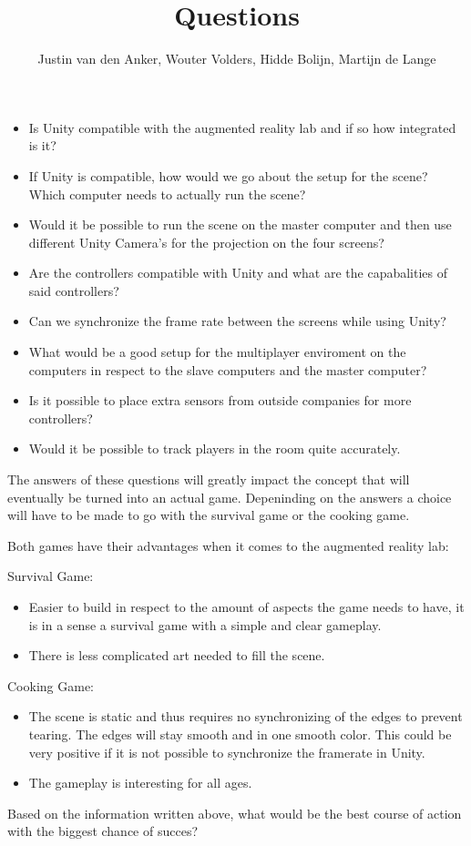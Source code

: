 \documentclass[10pt,a4paper]{article}
\author{Justin van den Anker, Wouter Volders, Hidde Bolijn, Martijn de Lange}
\title{Questions}
\begin{document}
\maketitle

\begin{itemize}
\item Is Unity compatible with the augmented reality lab and if so how integrated is it?
\item If Unity is compatible, how would we go about the setup for the scene? Which computer needs to actually run the scene?
\item Would it be possible to run the scene on the master computer and then use different Unity Camera's for the projection on the four screens?
\item Are the controllers compatible with Unity and what are the capabalities of said controllers?
\item Can we synchronize the frame rate between the screens while using Unity?
\item What would be a good setup for the multiplayer enviroment on the computers in respect to the slave computers and the master computer?
\item Is it possible to place extra sensors from outside companies for more controllers?
\item Would it be possible to track players in the room quite accurately.

\end{itemize}
The answers of these questions will greatly impact the concept that will eventually be turned into an actual game. Depeninding on the answers a choice will have to be made to go with the survival game or the cooking game.

Both games have their advantages when it comes to the augmented reality lab:

Survival Game:
\begin{itemize}
\item Easier to build in respect to the amount of aspects the game needs to have, it is in a sense a survival game with a simple and clear gameplay.
\item There is less complicated art needed to fill the scene.
\end{itemize}

Cooking Game:
\begin{itemize}
\item The scene is static and thus requires no synchronizing of the edges to prevent tearing. The edges will stay smooth and in one smooth color. This could be very positive if it is not possible to synchronize the framerate in Unity.
\item The gameplay is interesting for all ages.
\end{itemize}

Based on the information written above, what would be the best course of action with the biggest chance of succes?
\end{document}
